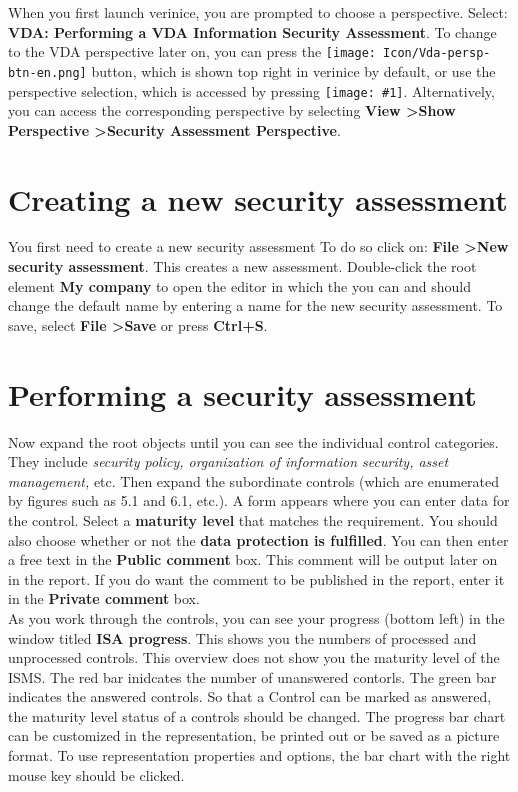 \documentclass[a4paper,10pt]{book}
\newcommand{\icon}[1]{\texttt{[image: \#1]}}
\begin{document}
When you first launch verinice, you are prompted to choose a
perspective. Select: \textbf{VDA: Performing a VDA Information
  Security Assessment}.
\newline
To change to the VDA perspective later on, you can press the \texttt{[image: Icon/Vda-persp-btn-en.png]}
button, which is shown top right in verinice by default, or use the perspective selection, which is accessed by pressing
\icon{Icon/New_persp.png}. Alternatively, you can access the corresponding perspective by selecting
\textbf{View \textgreater Show Perspective \textgreater Security Assessment Perspective}.

\section{Creating a new security assessment}
You first need to create a new security assessment To do so click on: \textbf{File \textgreater New security assessment}.
This creates a new assessment. Double-click the root element \textbf{My company} to open the editor in which the you can
and should change the default name by entering a name for the new security assessment. To save, select \textbf{File \textgreater Save}
or press \textbf{Ctrl+S}.

\section{Performing a security assessment}
Now expand the root objects until you can see the individual control categories. They include {\em security policy, organization of information security, asset management,}
etc. Then expand the subordinate controls (which are enumerated by figures such as 5.1 and 6.1, etc.). A form appears where you can enter data for the control. Select a
\textbf{maturity level} that matches the requirement. You should also choose whether or not the \textbf{data protection is fulfilled}. You can then enter a free text in the
\textbf{Public comment} box. This comment will be output later on in the report. If you do want the comment to be published in the report, enter it in the
\textbf{Private comment} box.
\newline\\
As you work through the controls, you can see your progress (bottom left) in the window titled \textbf{ISA progress}.
This shows you the numbers of processed and unprocessed controls. This overview does not show you the maturity level of the ISMS.
The red bar inidcates the number of unanswered contorls. The green bar indicates the answered controls. So that a Control can be marked as answered,
the maturity level status of a controls should be changed. The progress bar chart can be customized in the representation, be printed out or be saved as a picture format.
To use representation properties and options, the bar chart with the right mouse key should be clicked.
\end{document}
